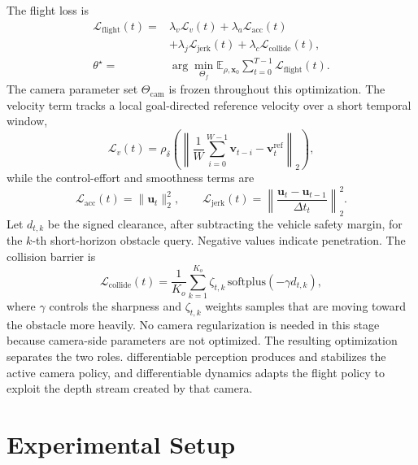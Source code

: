 \documentclass[letterpaper,journal]{IEEEtran}
\begin{document}
The flight loss is
\begin{equation}
\begin{aligned}
    \mathcal{L}_{\mathrm{flight}}(t)
    ={}&\lambda_v\mathcal{L}_v(t)
    +\lambda_a\mathcal{L}_{\mathrm{acc}}(t)
    \\
    &+\lambda_j\mathcal{L}_{\mathrm{jerk}}(t)
    +\lambda_c\mathcal{L}_{\mathrm{collide}}(t),\\
    \theta^\star
    ={}&\arg\min_{\Theta_f}
    \mathbb{E}_{\rho,\mathbf{x}_0}
    \sum_{t=0}^{T-1}\mathcal{L}_{\mathrm{flight}}(t).
    \label{eq:flight_loss}
\end{aligned}
\end{equation}
The camera parameter set $\Theta_{\mathrm{cam}}$ is frozen throughout this
optimization.
The velocity term tracks a local goal-directed reference velocity over a short
temporal window,
\begin{equation}
    \mathcal{L}_v(t)=
    \rho_{\delta}\!\left(
    \left\|
    \frac{1}{W}\sum_{i=0}^{W-1}\mathbf{v}_{t-i}
    -\mathbf{v}^{\mathrm{ref}}_t
    \right\|_2\right),
    \label{eq:flight_velocity_loss}
\end{equation}
while the control-effort and smoothness terms are
\begin{equation}
    \mathcal{L}_{\mathrm{acc}}(t)=\|\mathbf{u}_t\|_2^2,\qquad
    \mathcal{L}_{\mathrm{jerk}}(t)=
    \left\|\frac{\mathbf{u}_t-\mathbf{u}_{t-1}}{\Delta t_t}\right\|_2^2 .
    \label{eq:flight_smooth_loss}
\end{equation}
Let $d_{t,k}$ be the signed clearance, after subtracting the vehicle safety
margin, for the $k$-th short-horizon obstacle query. Negative values indicate
penetration. The collision barrier is
\begin{equation}
    \mathcal{L}_{\mathrm{collide}}(t)=
    \frac{1}{K_o}\sum_{k=1}^{K_o}
    \zeta_{t,k}\,
    \mathrm{softplus}(-\gamma d_{t,k}),
    \label{eq:collision_barrier}
\end{equation}
where $\gamma$ controls the sharpness and $\zeta_{t,k}$ weights samples that
are moving toward the obstacle more heavily. No camera regularization is needed
in this stage because camera-side parameters are not optimized. The resulting
optimization separates the two roles.
differentiable perception produces and stabilizes the active camera policy,
and differentiable dynamics adapts the flight policy to exploit the depth
stream created by that camera.

\section{Experimental Setup}
\end{document}
